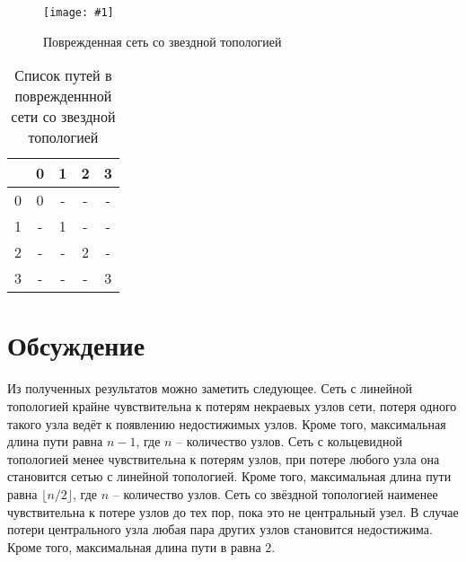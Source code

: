 \documentclass[a4paper,12pt]{article}
\newcommand{\plot}[3]{
    \begin{figure}[H]
        \begin{center}
            \texttt{[image: \#1]}
            \caption{#2}
            \label{#3}
        \end{center}
    \end{figure}
}
\begin{document}
    \plot{img/TopologyStar corrupted.png}{Поврежденная сеть со звездной топологией}{p:sl_c}

    \begin{table}[H]
    \caption{Список путей в поврежденнной сети со звездной топологией}
        \begin{tabular}{| c | c | c | c | c |}
            \hline
             & 0 & 1 & 2 & 3 \\
            \hline
            0 & 0 & - & - & - \\
            \hline
            1 & - & 1 & - & - \\
            \hline
            2 & - & - & 2 & - \\
            \hline
            3 & - & - & - & 3 \\
            \hline
        \end{tabular}
        \centering
    \end{table}

    \section{Обсуждение}
    \quad Из полученных результатов можно заметить следующее.
    Сеть с линейной топологией крайне чувствительна к потерям
    некраевых узлов сети, потеря одного такого узла ведёт к появлению недостижимых узлов. Кроме того, максимальная длина пути равна $ n - 1 $, где $n$ -- количество узлов.
    Сеть с кольцевидной топологией менее чувствительна к потерям узлов,
    при потере любого узла она становится сетью с линейной топологией. Кроме того, максимальная длина пути равна $ \lfloor n / 2 \rfloor $, где $n$ -- количество узлов.
    Сеть со звёздной топологией наименее чувствительна к потере узлов до тех пор, пока это не центральный узел. В случае потери центрального узла любая пара других узлов становится недостижима. Кроме того, максимальная длина пути в равна $ 2 $.  
\end{document}
